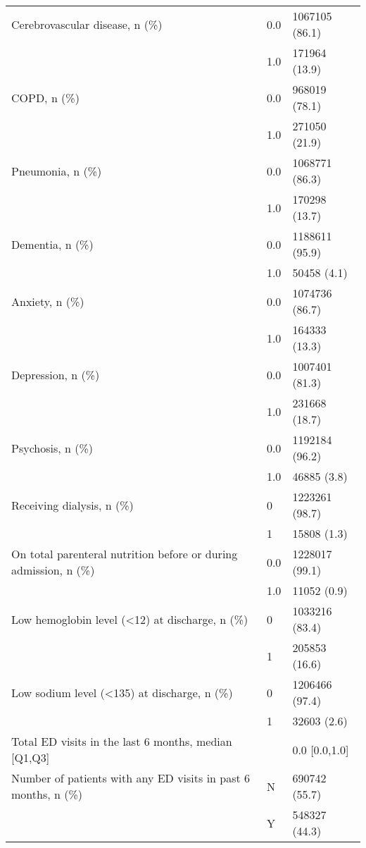 \begin{tabular}{lll}
Cerebrovascular disease, n (\%) & 0.0 &     1067105 (86.1) \\
                                       & 1.0 &      171964 (13.9) \\
COPD, n (\%) & 0.0 &      968019 (78.1) \\
                                       & 1.0 &      271050 (21.9) \\
Pneumonia, n (\%) & 0.0 &     1068771 (86.3) \\
                                       & 1.0 &      170298 (13.7) \\
Dementia, n (\%) & 0.0 &     1188611 (95.9) \\
                                       & 1.0 &        50458 (4.1) \\
Anxiety, n (\%) & 0.0 &     1074736 (86.7) \\
                                       & 1.0 &      164333 (13.3) \\
Depression, n (\%) & 0.0 &     1007401 (81.3) \\
                                       & 1.0 &      231668 (18.7) \\
Psychosis, n (\%) & 0.0 &     1192184 (96.2) \\
                                       & 1.0 &        46885 (3.8) \\
Receiving dialysis, n (\%) & 0 &     1223261 (98.7) \\
                                       & 1 &        15808 (1.3) \\
On total parenteral nutrition before or during admission, n (\%) & 0.0 &     1228017 (99.1) \\
                                       & 1.0 &        11052 (0.9) \\
Low hemoglobin level (<12) at discharge, n (\%) & 0 &     1033216 (83.4) \\
                                       & 1 &      205853 (16.6) \\
Low sodium level (<135) at discharge, n (\%) & 0 &     1206466 (97.4) \\
                                       & 1 &        32603 (2.6) \\
Total ED visits in the last 6 months, median [Q1,Q3] &   &      0.0 [0.0,1.0] \\
Number of patients with any ED visits in past 6 months, n (\%) & N &      690742 (55.7) \\
                                       & Y &      548327 (44.3) \\

\end{tabular}
